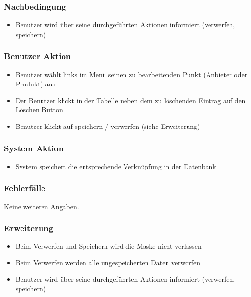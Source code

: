 \documentclass[a4paper,12pt]{article}
\begin{document}
\subsubsection{Nachbedingung}\label{nachbedingung-10}

\begin{itemize}

\item
  Benutzer wird über seine durchgeführten Aktionen informiert
  (verwerfen, speichern)
\end{itemize}

\subsubsection{Benutzer Aktion}\label{benutzer-aktion-10}

\begin{itemize}

\item
  Benutzer wählt links im Menü seinen zu bearbeitenden Punkt (Anbieter
  oder Produkt) aus
\item
  Der Benutzer klickt in der Tabelle neben dem zu löschenden Eintrag auf
  den Löschen Button
\item
  Benutzer klickt auf speichern / verwerfen (siehe Erweiterung)
\end{itemize}

\subsubsection{System Aktion}\label{system-aktion-10}

\begin{itemize}

\item
  System speichert die entsprechende Verknüpfung in der Datenbank
\end{itemize}

\subsubsection{Fehlerfälle}\label{fehlerfalle-10}
Keine weiteren Angaben.

\subsubsection{Erweiterung}\label{erweiterung-10}

\begin{itemize}

\item
  Beim Verwerfen und Speichern wird die Maske nicht verlassen
\item
  Beim Verwerfen werden alle ungespeicherten Daten verworfen
\item
  Benutzer wird über seine durchgeführten Aktionen informiert
  (verwerfen, speichern)
\end{itemize}
\end{document}

